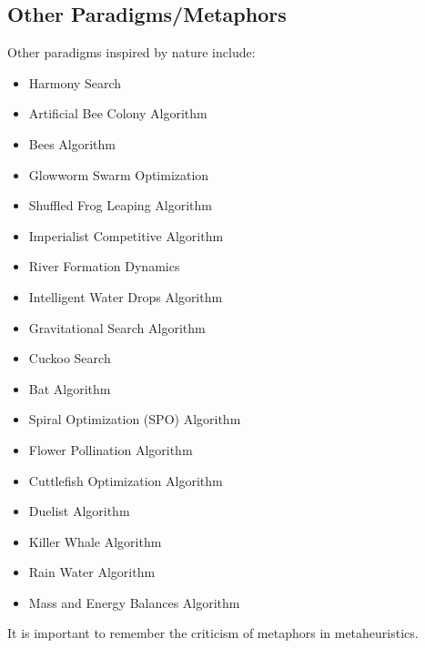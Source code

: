 \subsection*{Other Paradigms/Metaphors}
Other paradigms inspired by nature include:
\begin{itemize}
    \item Harmony Search
    \item Artificial Bee Colony Algorithm
    \item Bees Algorithm
    \item Glowworm Swarm Optimization
    \item Shuffled Frog Leaping Algorithm
    \item Imperialist Competitive Algorithm
    \item River Formation Dynamics
    \item Intelligent Water Drops Algorithm
    \item Gravitational Search Algorithm
    \item Cuckoo Search
    \item Bat Algorithm
    \item Spiral Optimization (SPO) Algorithm
    \item Flower Pollination Algorithm
    \item Cuttlefish Optimization Algorithm
    \item Duelist Algorithm
    \item Killer Whale Algorithm
    \item Rain Water Algorithm
    \item Mass and Energy Balances Algorithm
\end{itemize}
It is important to remember the criticism of metaphors in metaheuristics.

